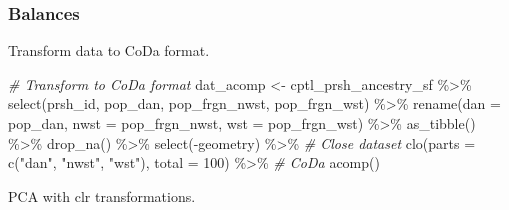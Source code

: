 \documentclass[
  12pt,
]{article}
\newenvironment{Shaded}{\begin{snugshade}}{\end{snugshade}}
\newcommand{\AttributeTok}[1]{\textcolor[rgb]{0.77,0.63,0.00}{#1}}
\newcommand{\CommentTok}[1]{\textcolor[rgb]{0.56,0.35,0.01}{\textit{#1}}}
\newcommand{\ControlFlowTok}[1]{\textcolor[rgb]{0.13,0.29,0.53}{\textbf{#1}}}
\newcommand{\DecValTok}[1]{\textcolor[rgb]{0.00,0.00,0.81}{#1}}
\newcommand{\FunctionTok}[1]{\textcolor[rgb]{0.00,0.00,0.00}{#1}}
\newcommand{\NormalTok}[1]{#1}
\newcommand{\OtherTok}[1]{\textcolor[rgb]{0.56,0.35,0.01}{#1}}
\newcommand{\SpecialCharTok}[1]{\textcolor[rgb]{0.00,0.00,0.00}{#1}}
\newcommand{\StringTok}[1]{\textcolor[rgb]{0.31,0.60,0.02}{#1}}
\begin{document}
\hypertarget{balances}{%
\subsubsection{Balances}\label{balances}}

Transform data to CoDa format.

\begin{Shaded}
\begin{Highlighting}[]
\CommentTok{\# Transform to CoDa format}
\NormalTok{dat\_acomp }\OtherTok{\textless{}{-}}\NormalTok{ cptl\_prsh\_ancestry\_sf }\SpecialCharTok{\%\textgreater{}\%}
  \FunctionTok{select}\NormalTok{(prsh\_id, pop\_dan, pop\_frgn\_nwst, pop\_frgn\_wst) }\SpecialCharTok{\%\textgreater{}\%}
  \FunctionTok{rename}\NormalTok{(}\AttributeTok{dan =}\NormalTok{ pop\_dan, }
         \AttributeTok{nwst =}\NormalTok{ pop\_frgn\_nwst,}
         \AttributeTok{wst =}\NormalTok{ pop\_frgn\_wst) }\SpecialCharTok{\%\textgreater{}\%} 
  \FunctionTok{as\_tibble}\NormalTok{() }\SpecialCharTok{\%\textgreater{}\%}
  \FunctionTok{drop\_na}\NormalTok{() }\SpecialCharTok{\%\textgreater{}\%} 
  \FunctionTok{select}\NormalTok{(}\SpecialCharTok{{-}}\NormalTok{geometry) }\SpecialCharTok{\%\textgreater{}\%}
  \CommentTok{\# Close dataset}
  \FunctionTok{clo}\NormalTok{(}\AttributeTok{parts =} \FunctionTok{c}\NormalTok{(}\StringTok{"dan"}\NormalTok{, }\StringTok{"nwst"}\NormalTok{, }\StringTok{"wst"}\NormalTok{),}
      \AttributeTok{total =} \DecValTok{100}\NormalTok{) }\SpecialCharTok{\%\textgreater{}\%} 
  \CommentTok{\# CoDa}
  \FunctionTok{acomp}\NormalTok{()}
\end{Highlighting}
\end{Shaded}

PCA with clr transformations.

\begin{Shaded}
\end{Shaded}
\end{document}
